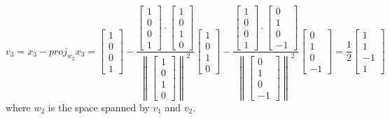 \documentclass{article}
\begin{document}
\begin{equation*}v_3=x_3-proj_{w_2}x_3=\begin{bmatrix}1\\0\\0\\1\end{bmatrix}-\frac{\begin{bmatrix}1\\0\\0\\1\end{bmatrix}\cdot\begin{bmatrix}1\\0\\1\\0\end{bmatrix}}{\left\lVert\begin{bmatrix}1\\0\\1\\0\end{bmatrix}\right\rVert^2}\begin{bmatrix}1\\0\\1\\0\end{bmatrix}-\frac{\begin{bmatrix}1\\0\\0\\1\end{bmatrix}\cdot\begin{bmatrix}0\\1\\0\\-1\end{bmatrix}}{\left\lVert\begin{bmatrix}0\\1\\0\\-1\end{bmatrix}\right\rVert^2}\begin{bmatrix}0\\1\\0\\-1\end{bmatrix}=\frac{1}{2}\begin{bmatrix}1\\1\\-1\\1\end{bmatrix}\end{equation*}where $w_2$ is the space spanned by $v_1$ and $v_2$.
\end{document}
